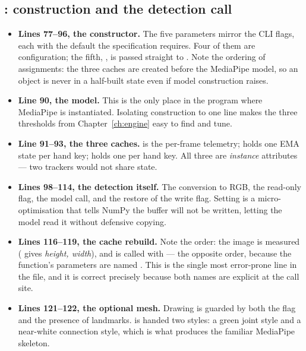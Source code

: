 \subsection{: construction and the detection call}

\begin{codecard}

\end{codecard}

\begin{itemize}
  \item \textbf{Lines 77--96, the constructor.} The five parameters mirror the CLI flags, each with
        the default the specification requires. Four of them are configuration; the fifth,
        , is passed straight to . Note the ordering of
        assignments: the three caches are created before the MediaPipe model, so an object is never
        in a half-built state even if model construction raises.
  \item \textbf{Line 90, the model.} This is the only place in the program where MediaPipe is
        instantiated. Isolating construction to one line makes the three thresholds from
        Chapter~\ref{ch:engine} easy to find and tune.
  \item \textbf{Line 91--93, the three caches.}  is the per-frame telemetry;
         holds one EMA state per hand key;  holds one
         per hand key. All three are \emph{instance} attributes --- two
        trackers would not share state.
  \item \textbf{Lines 98--114, the detection itself.} The conversion to RGB, the read-only flag, the
        model call, and the restore of the write flag. Setting  is
        a micro-optimisation that tells NumPy the buffer will not be written, letting the model read
        it without defensive copying.
  \item \textbf{Lines 116--119, the cache rebuild.} Note the order: the image is measured
        ( gives \emph{height, width}), and  is called
        with  --- the opposite order, because the function's parameters are
        named . This is the single most error-prone line in the file, and it is
        correct precisely because both names are explicit at the call site.
  \item \textbf{Lines 121--122, the optional mesh.} Drawing is guarded by both the  flag
        and the presence of landmarks.  is handed two styles: a
        green joint style and a near-white connection style, which is what produces the familiar
        MediaPipe skeleton.
\end{itemize}

